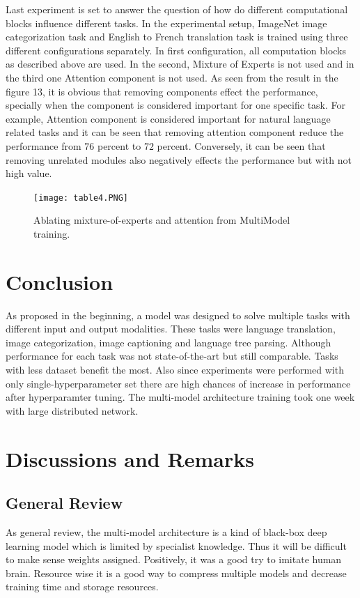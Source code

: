 \documentclass[12pt]{article}
\begin{document}
Last experiment is set to answer the question of how do different computational blocks influence different tasks. In the experimental setup, ImageNet image categorization task and English to French translation task is trained using three different configurations separately. In first configuration, all computation blocks as described above are used. In the second, Mixture of Experts is not used and in the third one Attention component is not used. As seen from the result in the figure 13, it is obvious that removing components effect the performance, specially when the component is considered important for one specific task. For example, Attention component is considered important for natural language related tasks and it can be seen that removing attention component reduce the performance from $76$ percent to $72$ percent. Conversely, it can be seen that removing unrelated modules also negatively effects the performance but with not high value.
\begin{center}
\begin{figure}[h]
  \centering
  \begin{minipage}[b]{1.0\textwidth}
    \centering
    \texttt{[image: table4.PNG]}
      \centering
    \caption{Ablating mixture-of-experts and attention from MultiModel training.}
  \end{minipage}
\end{figure}
\end{center}
\section{Conclusion}
As proposed in the beginning, a model was designed to solve multiple tasks with different input and output modalities. These tasks were language translation, image categorization, image captioning and language tree parsing. Although performance for each task was not state-of-the-art but still comparable. Tasks with less dataset benefit the most. Also since experiments were performed with only single-hyperparameter set there are high chances of increase in performance after hyperparamter tuning. The multi-model architecture training took one week with large distributed network.
\section{Discussions and Remarks}
\subsection{General Review}
As general review, the multi-model architecture is a kind of black-box deep learning model which is limited by specialist knowledge. Thus it will be difficult to make sense weights assigned. Positively, it was a good try to imitate human brain. Resource wise it is a good way to compress multiple models and decrease training time and storage resources.\\
\end{document}
